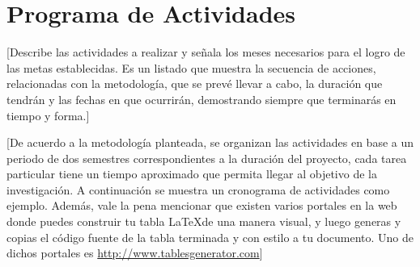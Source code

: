 \section{Programa de Actividades}

[Describe las actividades a realizar y señala los meses necesarios para el logro de las metas establecidas.
Es un listado que muestra la secuencia de acciones, relacionadas con la metodología, que se prevé llevar a cabo, la duración que tendrán y las fechas en que ocurrirán, demostrando siempre que terminarás en tiempo y forma.]


[De acuerdo a la metodología planteada, se organizan las actividades en base a un periodo de dos semestres correspondientes a la duración del proyecto, cada tarea particular tiene un tiempo aproximado que permita llegar al objetivo de la investigación.
A continuación se muestra un cronograma de actividades como ejemplo. 
Además, vale la pena mencionar que existen varios portales en la web donde puedes construir tu tabla \LaTeX de una manera visual, y luego generas y copias el código fuente de la tabla terminada y con estilo a tu documento. Uno de dichos portales es \url{http://www.tablesgenerator.com}]

